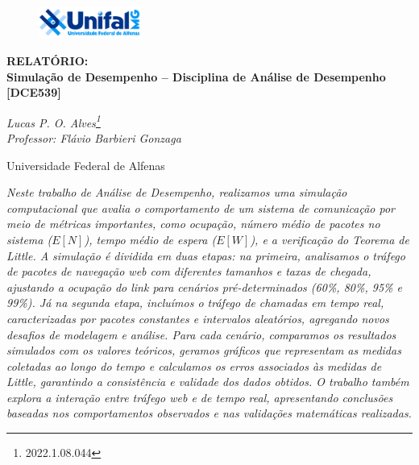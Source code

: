 \begin{center}
\begin{figure}[H]
    \centering
    \includegraphics[width=0.3\textwidth]{Imagens/logo.png}
\end{figure}

\textbf{\Large RELATÓRIO: \\ Simulação de Desempenho – Disciplina de Análise de Desempenho [DCE539] }
\end{center}

\begin{center}
\textit{
    Lucas P. O. Alves\footnote{2022.1.08.044}\\
    Professor: Flávio Barbieri Gonzaga
}
\end{center}

\begin{center}
    Universidade Federal de Alfenas
\end{center}

\begin{center}
\textit{Neste trabalho de Análise de Desempenho, realizamos uma simulação computacional que avalia o comportamento de um sistema de comunicação por meio de métricas importantes, como ocupação, número médio de pacotes no sistema ($E[N]$), tempo médio de espera ($E[W]$), e a verificação do Teorema de Little.
A simulação é dividida em duas etapas: na primeira, analisamos o tráfego de pacotes de navegação web com diferentes tamanhos e taxas de chegada, ajustando a ocupação do link para cenários pré-determinados (60\%, 80\%, 95\% e 99\%). Já na segunda etapa, incluímos o tráfego de chamadas em tempo real, caracterizadas por pacotes constantes e intervalos aleatórios, agregando novos desafios de modelagem e análise.
Para cada cenário, comparamos os resultados simulados com os valores teóricos, geramos gráficos que representam as medidas coletadas ao longo do tempo e calculamos os erros associados às medidas de Little, garantindo a consistência e validade dos dados obtidos. O trabalho também explora a interação entre tráfego web e de tempo real, apresentando conclusões baseadas nos comportamentos observados e nas validações matemáticas realizadas.}
\end{center}
